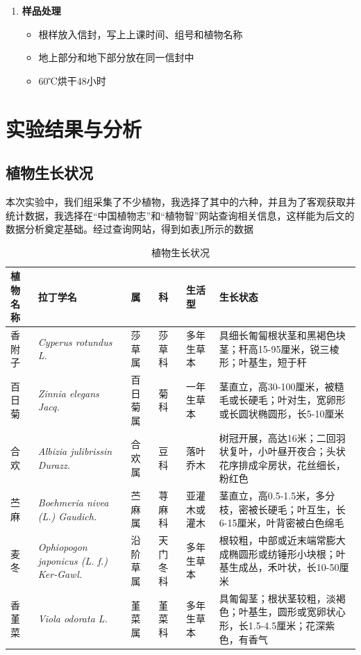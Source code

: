 \documentclass[10.5pt]{config}
\begin{document}
\begin{enumerate}
    \item \textbf{样品处理}
    \begin{itemize}
        \item 根样放入信封，写上上课时间、组号和植物名称
        \item 地上部分和地下部分放在同一信封中
        \item 60℃烘干48小时
    \end{itemize}
\end{enumerate}

\section{实验结果与分析}

\subsection{植物生长状况}

本次实验中，我们组采集了不少植物，我选择了其中的六种，并且为了客观获取并统计数据，我选择在“中国植物志”和“植物智”网站查询相关信息，这样能为后文的数据分析奠定基础。经过查询网站，得到如表\ref{tab:plant_info}所示的数据

\begin{table}[htbp]
\centering
\caption{植物生长状况}
\label{tab:plant_info}
\renewcommand{\arraystretch}{1.2} %
    \setlength{\tabcolsep}{8pt}      %
\begin{tabular}{|p{1.6cm}|p{3.5cm}|p{1.6cm}|p{1.6cm}|p{2.2cm}|p{5cm}|}
\hline
植物名称 & 拉丁学名 & 属 & 科 & 生活型 & 生长状态 \\
\hline
香附子 & \textit{Cyperus rotundus L.} & 莎草属 & 莎草科 & 多年生草本 & 具细长匍匐根状茎和黑褐色块茎；秆高15-95厘米，锐三棱形；叶基生，短于秆 \\
\hline
百日菊 & \textit{Zinnia elegans Jacq.} & 百日菊属 & 菊科 & 一年生草本 & 茎直立，高30-100厘米，被糙毛或长硬毛；叶对生，宽卵形或长圆状椭圆形，长5-10厘米\\
\hline
合欢 & \textit{Albizia julibrissin Durazz.} & 合欢属 & 豆科 & 落叶乔木 & 树冠开展，高达16米；二回羽状复叶，小叶昼开夜合；头状花序排成伞房状，花丝细长，粉红色\\
\hline
苎麻 & \textit{Boehmeria nivea (L.) Gaudich.} & 苎麻属 & 荨麻科 & 亚灌木或灌木 & 茎直立，高0.5-1.5米，多分枝，密被长硬毛；叶互生，长6-15厘米，叶背密被白色绵毛\\
\hline
麦冬 & \textit{Ophiopogon japonicus (L. f.) Ker-Gawl.} & 沿阶草属 & 天门冬科 & 多年生草本 & 根较粗，中部或近末端常膨大成椭圆形或纺锤形小块根；叶基生成丛，禾叶状，长10-50厘米\\
\hline
香堇菜 & \textit{Viola odorata L.} & 堇菜属 & 堇菜科 & 多年生草本 & 具匍匐茎；根状茎较粗，淡褐色；叶基生，圆形或宽卵状心形，长1.5-4.5厘米；花深紫色，有香气 \\
\hline
\end{tabular}
\end{table}
\end{document}
